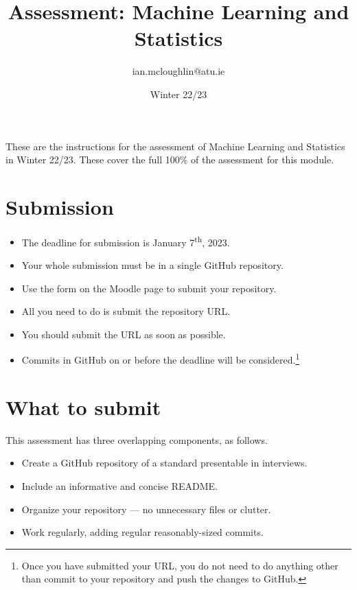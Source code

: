 \documentclass[a4paper]{tufte-handout}
\title{Assessment: Machine Learning and Statistics}
\author{ian.mcloughlin@atu.ie}
\date{Winter 22/23}
\begin{document}
 
\maketitle

These are the instructions for the assessment of Machine Learning and Statistics in Winter 22/23.
These cover the full 100\% of the assessment for this module.


\section{Submission}

\begin{itemize}
  \item The deadline for submission is January 7\textsuperscript{th}, 2023. 
  \item Your whole submission must be in a single GitHub repository.
  \item Use the form on the Moodle page to submit your repository.
  \item All you need to do is submit the repository URL.
  \item You should submit the URL as soon as possible.
  \item Commits in GitHub on or before the deadline will be considered.\footnote{Once you have submitted your URL, you do not need to do anything other than commit to your repository and push the changes to GitHub.}
\end{itemize}


\section{What to submit}
This assessment has three overlapping components, as follows.

\begin{itemize}
  \item Create a GitHub repository of a standard presentable in interviews.
  \item Include an informative and concise README.
  \item Organize your repository --- no unnecessary files or clutter.
  \item Work regularly, adding regular reasonably-sized commits.
\end{itemize}
\end{document}
